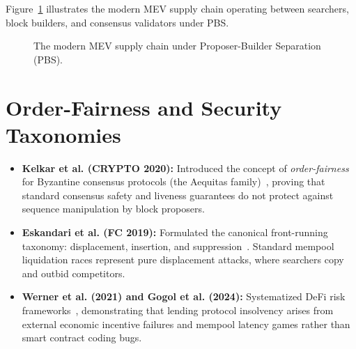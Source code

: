 Figure~\ref{fig:pbs_supply_chain} illustrates the modern MEV supply chain operating between searchers, block builders, and consensus validators under PBS.

\begin{figure}[htbp]
\centering
{}
\caption{The modern MEV supply chain under Proposer-Builder Separation (PBS).}
\label{fig:pbs_supply_chain}
\end{figure}

\section{Order-Fairness and Security Taxonomies}
\begin{itemize}
    \item \textbf{Kelkar et al. (CRYPTO 2020):} Introduced the concept of \textit{order-fairness} for Byzantine consensus protocols (the Aequitas family)~\cite{kelkar2020order}, proving that standard consensus safety and liveness guarantees do not protect against sequence manipulation by block proposers.
    
    \item \textbf{Eskandari et al. (FC 2019):} Formulated the canonical front-running taxonomy: displacement, insertion, and suppression~\cite{eskandari2019sok}. Standard mempool liquidation races represent pure displacement attacks, where searchers copy and outbid competitors.
    
    \item \textbf{Werner et al. (2021) and Gogol et al. (2024):} Systematized DeFi risk frameworks~\cite{werner2021sok,gogol2024sok}, demonstrating that lending protocol insolvency arises from external economic incentive failures and mempool latency games rather than smart contract coding bugs.
\end{itemize}


